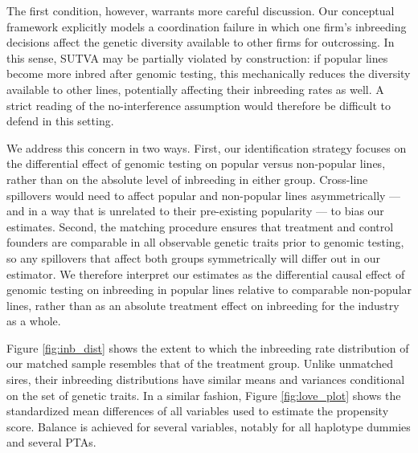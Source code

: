 \documentclass[12pt,letterpaper]{article}
\begin{document}
The first condition, however, warrants more careful discussion. Our conceptual framework explicitly models a coordination failure in which one firm's inbreeding decisions affect the genetic diversity available to other firms for outcrossing. In this sense, SUTVA may be partially violated by construction: if popular lines become more inbred after genomic testing, this mechanically reduces the diversity available to other lines, potentially affecting their inbreeding rates as well. A strict reading of the no-interference assumption would therefore be difficult to defend in this setting.

We address this concern in two ways. First, our identification strategy focuses on the differential effect of genomic testing on popular versus non-popular lines, rather than on the absolute level of inbreeding in either group. Cross-line spillovers would need to affect popular and non-popular lines asymmetrically — and in a way that is unrelated to their pre-existing popularity — to bias our estimates. Second, the matching procedure ensures that treatment and control founders are comparable in all observable genetic traits prior to genomic testing, so any spillovers that affect both groups symmetrically will differ out in our estimator. We therefore interpret our estimates as the differential causal effect of genomic testing on inbreeding in popular lines relative to comparable non-popular lines, rather than as an absolute treatment effect on inbreeding for the industry as a whole.

Figure \ref{fig:inb_dist} shows the extent to which the inbreeding rate distribution of our matched sample resembles that of the treatment group. Unlike unmatched sires, their inbreeding distributions have similar means and variances conditional on the set of genetic traits. In a similar fashion, Figure \ref{fig:love_plot} shows the standardized mean differences of all variables used to estimate the propensity score. Balance is achieved for several variables, notably for all haplotype dummies and several PTAs.

\end{document}
